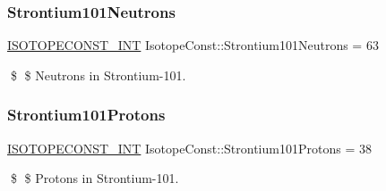 \subsubsection{\texorpdfstring{Strontium101\+Neutrons}{Strontium101Neutrons}}
{\footnotesize\ttfamily \mbox{\hyperlink{group___isotope_const-_macros_ga5f18360b3e99483a35c32d789e62621c}{I\+S\+O\+T\+O\+P\+E\+C\+O\+N\+S\+T\+\_\+\+I\+NT}} Isotope\+Const\+::\+Strontium101\+Neutrons = 63}

\$ \$ Neutrons in Strontium-\/101. \mbox{\label{group___isotope_const-_strontium-_sr101_gae09310cc8ebd8435b397d1d472a1aec8}} 
\subsubsection{\texorpdfstring{Strontium101\+Protons}{Strontium101Protons}}
{\footnotesize\ttfamily \mbox{\hyperlink{group___isotope_const-_macros_ga5f18360b3e99483a35c32d789e62621c}{I\+S\+O\+T\+O\+P\+E\+C\+O\+N\+S\+T\+\_\+\+I\+NT}} Isotope\+Const\+::\+Strontium101\+Protons = 38}

\$ \$ Protons in Strontium-\/101. 